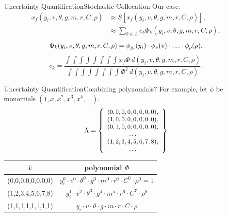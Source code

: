 \documentclass{beamer}
\begin{document}
\begin{frame}{Uncertainty Quantification}{Stochastic Collocation}\vspace{-20pt}
Our case:
\begin{align*}
x_f(y_i,v,\theta,g,m,r,C,\rho)&\approx S[x_f(y_i,v,\theta,g,m,r,C,\rho)],\\
  &\approx\sum_{k\in\Lambda}c_k\Phi_k(y_i,v,\theta,g,m,r,C,\rho),
\end{align*}
\begin{equation*}
\Phi_k(y_i,v,\theta,g,m,r,C,\rho) = \phi_{y_i}(y_i)\cdot\phi_{v}(v)\cdot\ldots\cdot\phi_{\rho}(\rho).\vspace{10pt}
\end{equation*}
\begin{equation*}
c_k = \frac{\int\int\int\int\int\int\int\int x_f\Phi\ d(y_i,v,\theta,g,m,r,C,\rho)}{\int\int\int\int\int\int\int\int \Phi^2\ d(y_i,v,\theta,g,m,r,C,\rho)}.
\end{equation*}
\end{frame}

\begin{frame}{Uncertainty Quantification}{Combining polynomials?}
For example, let $\phi$ be monomials $(1,x,x^2,x^3,x^4,...)$.
\begin{equation*}\small
\Lambda = \left\{
\begin{array}{c}
(0,0,0,0,0,0,0,0), \\
(1,0,0,0,0,0,0,0), \\
(0,1,0,0,0,0,0,0), \\
\ldots \\
(1,2,3,4,5,6,7,8), \\
\ldots \\
\end{array}\right\}
\end{equation*}\normalsize
\begin{table}
\centering
\begin{tabular}{c c}
$k$ & polynomial $\Phi$ \\ \hline
(0,0,0,0,0,0,0,0) &  $y_i^0 \cdot v^0 \cdot \theta^0 \cdot g^0 \cdot m^0 \cdot r^0 \cdot C^0 \cdot \rho^0 = 1$ \\
(1,2,3,4,5,6,7,8) &  $y_i^1 \cdot v^2 \cdot \theta^3 \cdot g^4 \cdot m^5 \cdot r^6 \cdot C^7 \cdot \rho^8$ \\
(1,1,1,1,1,1,1,1) & $ y_i \cdot v \cdot \theta \cdot g \cdot m \cdot r \cdot C \cdot \rho$ \\
\end{tabular}
\end{table}
\end{frame}
\end{document}
